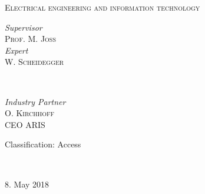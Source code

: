 \begin{titlepage}
	\textsc{\normalsize Electrical engineering and information technology}\\[0.3cm] %
	
	\vfill
	
	
	\begin{minipage}{0.4\textwidth}
		\begin{flushleft}
			\normalsize
			\textit{Supervisor}\\
			\textsc{Prof.} M. \textsc{Joss} %
			\vspace{4mm}\\
			\normalsize
			\textit{Expert}\\
			W. \textsc{Scheidegger} %
		\end{flushleft}
	\end{minipage}
	~
	\begin{minipage}{0.4\textwidth}
		\begin{flushright}
			\normalsize
			\textit{Industry Partner}\\
			O. \textsc{Kirchhoff}\\
			CEO ARIS
		\end{flushright}
	\end{minipage}
	
	\vspace{0.8cm}
	
	\begin{minipage}{0.4\textwidth}
		\begin{flushleft}
			{\normalsize Classification: Access}
		\end{flushleft}
	\end{minipage}
	~
	\begin{minipage}{0.4\textwidth}
		\begin{flushright}
			{\normalsize 8. May 2018} %
		\end{flushright}
	\end{minipage}
	
\end{titlepage}